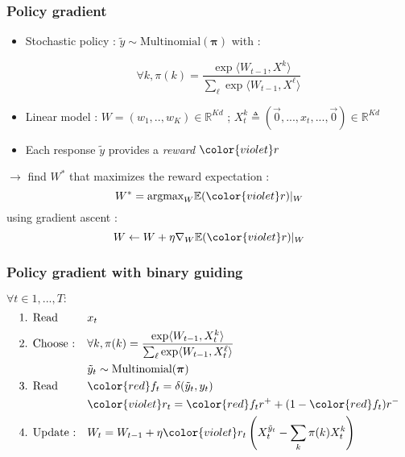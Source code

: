 \documentclass{beamer}
\begin{document}
\begin{frame}\frametitle{Policy gradient \cite{Wil92}}
	
	\begin{itemize}
		\item Stochastic policy : $\tilde{y} \sim \text{Multinomial}(\boldsymbol{\pi})$ with :
		\begin{exampleblock}{}
			$$ \forall k,  \pi(k) = \frac{\exp\langle W_{t-1}, X^k\rangle}{\sum_{\ell}\exp\langle W_{t-1}, X^\ell\rangle}$$
		\end{exampleblock}
		\item Linear model : $W = (w_1,..,w_K) \in \mathbb{R}^{K d}$ ; 
			$X_t^k \triangleq (\vec{0}, ...,  x_t, ..., \vec{0}) \in \mathbb{R}^{K d}$
		\item Each response $\tilde{y}$ provides a \emph{reward} ${\color{violet}r}$
	\end{itemize}
	    
    $\rightarrow$ find $W^*$ that maximizes the reward expectation :
		$$ W^*  = \text{argmax}_W \mathbb{E}({\color{violet}r})|_W$$
		using gradient ascent : 
		$$ W \leftarrow W + \eta \nabla_W \mathbb{E}({\color{violet}r})|_W $$

\end{frame}

\begin{frame}\frametitle{Policy gradient {\color{red} with binary guiding}}
	\begin{block}{}
		$\forall t \in 1,...,T :$
		\begin{align*}
		&\text{1. Read } 
		&& x_t 
		\\
		&\text{2. Choose :} 
		&& \forall k, \pi(k) = \frac{\exp\langle W_{t-1}, X_t^k\rangle}{\sum_{\ell}\exp\langle W_{t-1}, X_t^\ell\rangle}
		\\
		&
		&& \tilde{y}_t \sim \text{Multinomial}(\boldsymbol{\pi})
		\\
		&\text{3. Read } 
		&& {\color{red} f_t = \delta(\tilde{y}_t ,y_t)} 
		\\
		&
		&& {\color{violet}r_t} =  {\color{red} f_t} r^+ +(1-{\color{red} f_t}) r^-
		\\
		&\text{4. Update :} 
		&& W_t = W_{t-1} + \eta {\color{violet}r_t} \left(X_t^{\tilde{y}_t} - \sum_k \pi(k) X_t^k \right) 
		\end{align*}
	\end{block}	
	
\end{frame}

	
\end{document}
